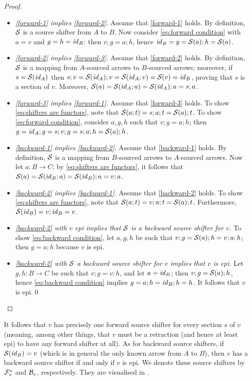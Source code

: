 \begin{proof}~
\begin{itemize}
\item \emph{\ref{forward-1} implies \ref{forward-2}.}
%
Assume that \ref{forward-1} holds. By definition, $\mathcal{S}$ is a source shifter from $A$ to $B$. Now consider \eqref{eq:forward condition} with $a=v$ and $g=h=\mathit{id}_B$: then $v;g=a;h$, hence $\mathit{id}_B=g = \mathcal{S}(a);h=\mathcal{S}(a)$.

\item \emph{\ref{forward-2} implies \ref{forward-3}.}
%
Assume that \ref{forward-2} holds. By definition, $\mathcal{S}$ is a mapping from $A$-sourced arrows to $B$-sourced arrows; moreover, if $s=\mathcal{S}(\mathit{id}_A)$ then $s;v=\mathcal{S}(\mathit{id}_A);v=\mathcal{S}(\mathit{id}_A;v)=\mathcal{S}(v)=\mathit{id}_B$, proving that $s$ is a section of $v$. Moreover, $\mathcal{S}(a)=\mathcal{S}(\mathit{id}_A;a)=\mathcal{S}(\mathit{id}_A);a=s;a$.

\item \emph{\ref{forward-3} implies \ref{forward-1}.}
%
Assume that \ref{forward-3} holds. To show \eqref{eq:shifters are functors}, note that $\mathcal{S}(a;t)=s;a;t=\mathcal{S}(a);t$. To show \eqref{eq:forward condition}, consider $a,g,h$ such that $v;g=a;h$; then $g=\mathit{id}_A;g=s;v;g=s;a;h = \mathcal{S}(a);h$.

\item \emph{\ref{backward-1} implies \ref{backward-2}.}
%
Assume that \ref{backward-1} holds. By definition, $\mathcal{S}$ is a mapping from $B$-sourced arrows to $A$-sourced arrows. Now let $a:B\to C$; by \eqref{eq:shifters are functors}, it follows that $\mathcal{S}(a)=\mathcal{S}(\mathit{id}_B;a)=\mathcal{S}(\mathit{id}_B);a=v;a$.

\item \emph{\ref{backward-2} implies \ref{backward-1}.}
%
Assume that \ref{backward-2} holds. To show \eqref{eq:shifters are functors}, note that $\mathcal{S}(a;t)=v;a;t=\mathcal{S}(a);t$. Furthermore, $\mathcal{S}(\mathit{id}_B)=v;\mathit{id}_B=v$.

\item \emph{\ref{backward-2} with $v$ epi implies that $\mathcal{S}$ is a backward source shifter for $v$.} To show \eqref{eq:backward condition}, let $a,g,h$ be such that $v;g=\mathcal{S}(a);h=v;a;h$; then $g=a;h$ because $v$ is epi.

\item \emph{\ref{backward-2} with $\mathcal{S}$ a backward source shifter for $v$ implies that $v$ is epi.} Let $g,h:B\to C$ be such that $v;g=v;h$, and let $a=\mathit{id}_B$; then $v;g=\mathcal{S}(a);h$, hence \eqref{eq:backward condition} implies $g=a;h=\mathit{id}_B;h=h$. It follows that $v$ is epi.\qed
\end{itemize}
\end{proof}
%
It follows that $v$ has precisely one forward source shifter for every section $s$ of $v$ (meaning, among other things, that $v$ must be a retraction (and hence at least epi) to have any forward shifter at all). As for backward source shifters, if $\mathcal{S}(\mathit{id}_B)=v$ (which is in general the only known arrow from $A$ to $B$), then $v$ has a backward source shifter if and only if $v$ is epi. We denote these source shifters by $\mathcal{F}_v^s$ and $\mathcal{B}_v$, respectively. They are visualised in .


